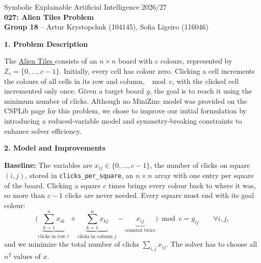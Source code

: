 \documentclass[a4paper,9pt]{article}
\begin{document}
\begin{center}
{\small Symbolic Explainable Artificial Intelligence 2026/27}\\
\vspace{4pt}
{\Large\textbf{027: Alien Tiles Problem}}\\[-1pt]
\vspace{2pt}
{\small \textbf{Group 18} -- Artur Krystopchuk (104145),
Sofia Ligeiro (116046)}
\end{center}

\textbf{1. Problem Description}

The \href{https://www.csplib.org/Problems/prob027/}
{Alien Tiles } consists of an $n\times n$ board with $c$ colours, represented by $\mathbb{Z}_c=\{0,\ldots,c-1\}$.
Initially, every cell has colour zero. Clicking a cell
increments the colours of all cells in its row and column,
$\mod c$, with the clicked cell incremented only once.
Given a target board $g$, the goal is to reach it using the
minimum number of clicks. Although no MiniZinc model was provided on the CSPLib page for this problem, we chose to improve our initial formulation by introducing a reduced-variable model and symmetry-breaking constraints to enhance solver efficiency.

\textbf{2. Model and Improvements}

\textbf{Baseline:}
The variables are $x_{ij}\in\{0,\ldots,c-1\}$, the number of clicks on square
$(i,j)$, stored in \texttt{clicks\_per\_square}, an $n\times n$ array with one
entry per square of the board. Clicking a square $c$ times brings every colour
back to where it was, so more than $c-1$ clicks are never needed. Every square
must end with its goal colour:
\[
\Big(\underbrace{\sum_{k=1}^{n}x_{ik}}_{\text{clicks in row }i}
+\underbrace{\sum_{k=1}^{n}x_{kj}}_{\text{clicks in column }j}
-\underbrace{x_{ij}}_{\text{counted twice}}\Big)\bmod c=g_{ij}
\qquad\forall i,j,
\]
and we minimize the total number of clicks $\sum_{i,j}x_{ij}$. The solver has to
choose all $n^2$ values of $x$.
\end{document}
